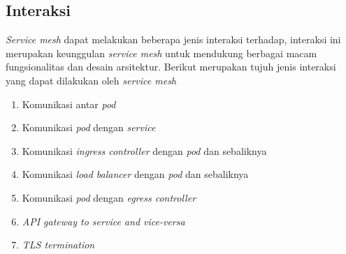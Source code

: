 \subsection{Interaksi}

\textit{Service mesh} dapat melakukan beberapa jenis interaksi terhadap, interaksi ini merupakan keunggulan \textit{service mesh} untuk mendukung berbagai macam fungsionalitas dan desain arsitektur. Berikut merupakan tujuh jenis interaksi yang dapat dilakukan oleh \textit{service mesh} \parencite{ganguli2021}

\begin{enumerate}
  \item Komunikasi antar \textit{pod}
  \item Komunikasi \textit{pod} dengan \textit{service}
  \item Komunikasi \textit{ingress controller} dengan \textit{pod} dan sebaliknya
  \item Komunikasi \textit{load balancer} dengan \textit{pod} dan sebaliknya
  \item Komunikasi \textit{pod} dengan \textit{egress controller}
  \item \textit{API gateway to service and vice-versa}
  \item \textit{TLS termination}
\end{enumerate}